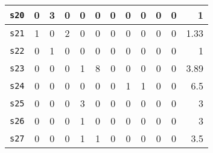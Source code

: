 \begin{table}[t]
{\begin{tabular}{l c c c c c c c c c c r}
	{\tt s20}&
	0 & \cellcolor{black!10} 3& 0& 0& 0& 0& 0& 0& 0& 0 & 1
	\\ 
	\midrule
	
	{\tt s21}&
	\cellcolor{black!10} 1 & 0& \cellcolor{black!10} 2& 0& 0& 0& 0& 0& 0& 0 & 1.33
	\\ 
	\midrule
	
	{\tt s22}&
	0 & \cellcolor{black!10} 1& 0& 0& 0& 0& 0& 0& 0& 0 & 1
	\\ 
	\midrule
	
	{\tt s23}&
   0 & 0& 0& \cellcolor{black!10} 1& \cellcolor{black!10} 8& 0& 0& 0& 0& 0 & 3.89
	\\ 
	\midrule
	
	{\tt s24}&
	0 & 0& 0& 0& 0& 0& \cellcolor{black!10} 1& \cellcolor{black!10} 1& 0& 0 & 6.5
	\\ \midrule
	
	{\tt s25}&
	0 & 0& 0& \cellcolor{black!10} 3 & 0& 0& 0& 0& 0& 0 & 3
	\\ 
	\midrule
	
	{\tt s26}&
	0 & 0& 0& \cellcolor{black!10} 1& 0& 0& 0& 0& 0& 0 & 3
	\\ 
	\midrule
	
	{\tt s27}&
	0 & 0& 0& \cellcolor{black!10} 1& \cellcolor{black!10} 1& 0& 0& 0& 0& 0 & 3.5
	\\ 
	

	\bottomrule
\end{tabular}
}
\label{table:table_layer}
\vspace{-1em}	
\end{table}